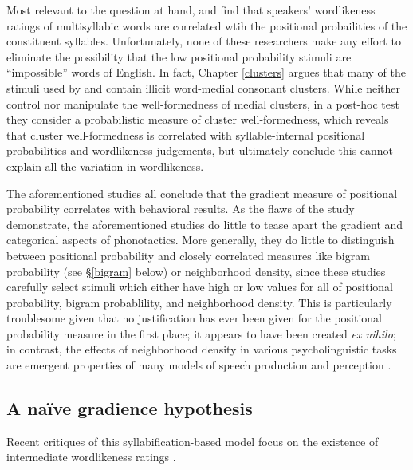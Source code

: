 Most relevant to the question at hand, \citet{Frisch2000} and \citet{Vitevitch1997} find that speakers' wordlikeness ratings of multisyllabic words are correlated wtih the positional probailities of the constituent syllables. Unfortunately, none of these researchers make any effort to eliminate the possibility that the low positional probability stimuli are ``impossible'' words of English. In fact, 
Chapter \ref{clusters} argues
that many of the stimuli used by \citeauthor{Frisch2000} and \citeauthor{Vitevitch1997} contain illicit word-medial consonant clusters. While \citeauthor{Vitevitch1997} neither control nor manipulate the well-formedness of medial clusters, in a post-hoc test they consider a probabilistic measure of cluster well-formedness, which reveals that cluster well-formedness is correlated with syllable-internal positional probabilities and wordlikeness judgements, but \citeauthor{Vitevitch1997} ultimately conclude this cannot explain all the variation in wordlikeness. 

The aforementioned studies all conclude that the gradient measure of positional probability correlates with behavioral results. As the flaws of the \citet{Vitevitch1997} study demonstrate, the aforementioned studies do little to tease apart the gradient and categorical aspects of phonotactics. More generally, they do little to distinguish between positional probability and closely correlated measures like bigram probability (see \S\ref{bigram} below) or neighborhood density, since these studies carefully select stimuli which either have high or low values for all of positional probability, bigram probablility, and neighborhood density. This is particularly troublesome given that no justification has ever been given for the positional probability measure in the first place; it appears to have been created \emph{ex nihilo}; in contrast, the effects of neighborhood density in various psycholinguistic tasks are emergent properties of many models of speech production \citep[e.g.,][]{Luce1998,Luce2000} and perception \citep{Marslen-Wilson1984,Marslen-Wilson1987,McClelland1986,Norris1994,Norris2000}. 

\subsection{A naïve gradience hypothesis}

Recent critiques of this syllabification-based model focus on the existence of intermediate wordlikeness ratings \citep[see also][]{Coleman1997,Anttila2008}.

